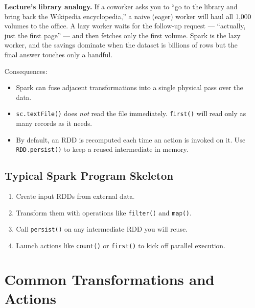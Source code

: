 \documentclass[11pt]{article}
\begin{document}
\textbf{Lecture's library analogy.} If a coworker asks you to ``go to the library and bring back the Wikipedia encyclopedia,'' a naive (eager) worker will haul all 1{,}000 volumes to the office. A lazy worker waits for the follow-up request --- ``actually, just the first page'' --- and then fetches only the first volume. Spark is the lazy worker, and the savings dominate when the dataset is billions of rows but the final answer touches only a handful.

Consequences:
\begin{itemize}
    \item Spark can fuse adjacent transformations into a single physical pass over the data.
    \item \texttt{sc.textFile()} does \emph{not} read the file immediately. \texttt{first()} will read only as many records as it needs.
    \item By default, an RDD is recomputed each time an action is invoked on it. Use \texttt{RDD.persist()} to keep a reused intermediate in memory.
\end{itemize}

\subsection{Typical Spark Program Skeleton}
\begin{enumerate}
    \item Create input RDDs from external data.
    \item Transform them with operations like \texttt{filter()} and \texttt{map()}.
    \item Call \texttt{persist()} on any intermediate RDD you will reuse.
    \item Launch actions like \texttt{count()} or \texttt{first()} to kick off parallel execution.
\end{enumerate}


\section{Common Transformations and Actions}
\end{document}
